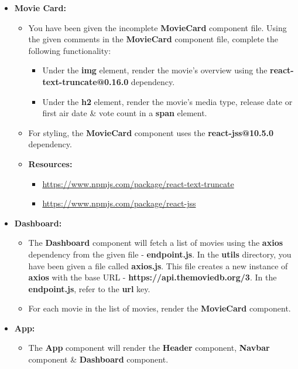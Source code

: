 \documentclass{article}
\begin{document}
\begin{itemize}
\begin{itemize}
	\end{itemize}
	\item \textbf{Movie Card:}
	\begin{itemize}
		\item You have been given the incomplete \textbf{MovieCard} component file. Using the given comments in the \textbf{MovieCard} component file, complete the following functionality:
		\begin{itemize}
			\item Under the \textbf{img} element, render the movie's overview using the \textbf{react-text-truncate@0.16.0} dependency. 
			\item Under the \textbf{h2} element, render the movie's media type, release date or first air date \& vote count in a \textbf{span} element. 
		\end{itemize}
		\item For styling, the \textbf{MovieCard} component uses the \textbf{react-jss@10.5.0} dependency.
		\item \textbf{Resources:}
		\begin{itemize}
			\item \href{https://www.npmjs.com/package/react-text-truncate}{https://www.npmjs.com/package/react-text-truncate}
			\item \href{https://www.npmjs.com/package/react-jss}{https://www.npmjs.com/package/react-jss}
		\end{itemize}
	\end{itemize}
	\item \textbf{Dashboard:}
	\begin{itemize}
		\item The \textbf{Dashboard} component will fetch a list of movies using the \textbf{axios} dependency from the given file - \textbf{endpoint.js}. In the \textbf{utils} directory, you have been given a file called \textbf{axios.js}. This file creates a new instance of \textbf{axios} with the base URL - \textbf{https://api.themoviedb.org/3}. In the \textbf{endpoint.js}, refer to the \textbf{url} key.
		\item For each movie in the list of movies, render the \textbf{MovieCard} component.
	\end{itemize}
	\item \textbf{App:}
	\begin{itemize}
		\item The \textbf{App} component will render the \textbf{Header} component, \textbf{Navbar} component \& \textbf{Dashboard} component.
	\end{itemize}
\end{itemize}
\end{document}
